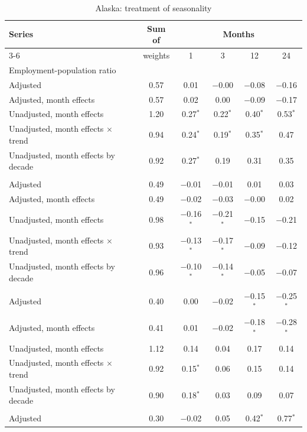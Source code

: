 \begin{table}[htbp]
\centering
\caption{Alaska: treatment of seasonality\label{tab:ak-seasonal}}
\footnotesize
\begin{tabular}{lccccc}
\toprule
Series & Sum of & \multicolumn{4}{c}{Months} \\
\cmidrule(lr){3-6}
 & weights & 1 & 3 & 12 & 24 \\
\midrule
\multicolumn{6}{l}{Employment-population ratio} \\
Adjusted & 0.57 & 0.01 & $-$0.00 & $-$0.08 & $-$0.16 \\
Adjusted, month effects & 0.57 & 0.02 & 0.00 & $-$0.09 & $-$0.17 \\
Unadjusted, month effects & 1.20 & 0.27$^{*}$ & 0.22$^{*}$ & 0.40$^{*}$ & 0.53$^{*}$ \\
Unadjusted, month effects $\times$ trend & 0.94 & 0.24$^{*}$ & 0.19$^{*}$ & 0.35$^{*}$ & 0.47 \\
Unadjusted, month effects by decade & 0.92 & 0.27$^{*}$ & 0.19 & 0.31 & 0.35 \\
\addlinespace
\multicolumn{6}{l}{Unemployment rate} \\
Adjusted & 0.49 & $-$0.01 & $-$0.01 & 0.01 & 0.03 \\
Adjusted, month effects & 0.49 & $-$0.02 & $-$0.03 & $-$0.00 & 0.02 \\
Unadjusted, month effects & 0.98 & $-$0.16$^{*}$ & $-$0.21$^{*}$ & $-$0.15 & $-$0.21 \\
Unadjusted, month effects $\times$ trend & 0.93 & $-$0.13$^{*}$ & $-$0.17$^{*}$ & $-$0.09 & $-$0.12 \\
Unadjusted, month effects by decade & 0.96 & $-$0.10$^{*}$ & $-$0.14$^{*}$ & $-$0.05 & $-$0.07 \\
\addlinespace
\multicolumn{6}{l}{Participation rate} \\
Adjusted & 0.40 & 0.00 & $-$0.02 & $-$0.15$^{*}$ & $-$0.25$^{*}$ \\
Adjusted, month effects & 0.41 & 0.01 & $-$0.02 & $-$0.18$^{*}$ & $-$0.28$^{*}$ \\
Unadjusted, month effects & 1.12 & 0.14 & 0.04 & 0.17 & 0.14 \\
Unadjusted, month effects $\times$ trend & 0.92 & 0.15$^{*}$ & 0.06 & 0.15 & 0.14 \\
Unadjusted, month effects by decade & 0.90 & 0.18$^{*}$ & 0.03 & 0.09 & 0.07 \\
\addlinespace
\multicolumn{6}{l}{Payroll employment} \\
Adjusted & 0.30 & $-$0.02 & 0.05 & 0.42$^{*}$ & 0.77$^{*}$ \\

\end{tabular}
\end{table}
